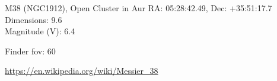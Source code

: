 \begin{block}{M38 (NGC1912), Open Cluster in Aur}
    RA: 05:28:42.49, Dec: +35:51:17.7 \\ 
    Dimensions: 9.6 \\ 
    Magnitude (V): 6.4



    Finder fov: 60 

    \url{https://en.wikipedia.org/wiki/Messier_38} 
\end{block}